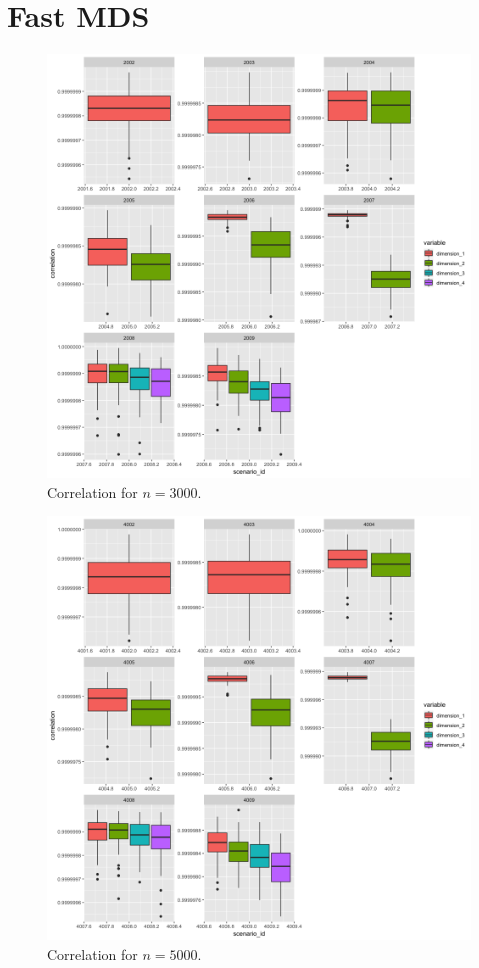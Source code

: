 \documentclass[11pt]{report}
\begin{document}
\section{Fast MDS}
\label{fast_corr}

\begin{figure}[ht]
\centering
    \includegraphics[scale = 1.5]{./images/fast_correlation_3000.png}
    \caption{Correlation for $n = 3000$.}
    \label{fast_correlation_3000}
\end{figure}

\begin{figure}[ht]
\centering
    \includegraphics[scale = 1.5]{./images/fast_correlation_5000.png}
    \caption{Correlation for $n = 5000$.}
    \label{fast_correlation_5000}
\end{figure}
\end{document}
